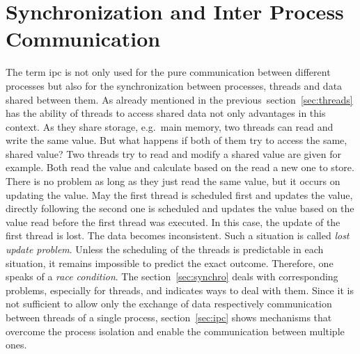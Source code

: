 \section{Synchronization and Inter Process Communication}\label{sec:ipc-and-synchro}
The term \acf{ipc} is not only used for the pure communication between different processes but also for the synchronization between processes, threads and data shared between them.
As already mentioned in the previous~section~\ref{sec:threads} has the ability of threads to access shared data not only advantages in this context.
As they share storage, e.g.\ main memory, two threads can read and write the same value.
But what happens if both of them try to access the same, shared value?
Two threads try to read and modify a shared value are given for example.
Both read the value and calculate based on the read a new one to store. 
There is no problem as long as they just read the same value, but it occurs on updating the value.
May the first thread is scheduled first and updates the value, directly following the second one is scheduled and updates the value based on the value read before the first thread was executed.
In this case, the update of the first thread is lost. 
The data becomes inconsistent.
Such a situation is called \textit{lost update problem}\cite{glatz2015betriebssysteme}.
Unless the scheduling of the threads is predictable in each situation, it remains impossible to predict the exact outcome.
Therefore, one speaks of a \textit{race condition}\cite{tanenbaum-modern-operating-systems}.
The section~\ref{sec:synchro} deals with corresponding problems, especially for threads, and indicates ways to deal with them.
Since it is not sufficient to allow only the exchange of data respectively communication between threads of a single process, section~\ref{sec:ipc} shows mechanisms that overcome the process isolation and enable the communication between multiple ones.

